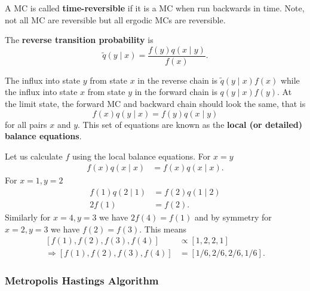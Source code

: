\begin{defe} \label{defe: trmc}
    A MC is called {\bf time-reversible} if it is a MC when run backwards in time. Note, not all MC are reversible but all ergodic MCs are reversible.
\end{defe}

\begin{defe} \label{defe: rtp}
    The {\bf reverse transition probability} is
    \[
        \tilde{q} (y \mid x) = \frac{f(y) q(x \mid y)}{f(x)}.
    \]
\end{defe}

The influx into state $y$ from state $x$ in the reverse chain is $\tilde{q} (y \mid x) f(x)$ while the influx into state $x$ from state $y$ in the forward chain is $q (y \mid x) f(y)$. At the limit state, the forward MC and backward chain should look the same, that is
\begin{equation*}
    f(x) q(y \mid x) = f(y) q (x \mid y)
\end{equation*}
for all pairs $x$ and $y$. This set of equations are known as the {\bf local (or detailed) balance equations}.

\begin{exam} \label{exam: lbe}
    Let us calculate $f$ using the local balance equations. For $x=y$
    \begin{align*}
        f (x) q(x \mid x) & = f (x) q(x \mid x).
    \end{align*}
    For $x= 1, y=2$
    \begin{align*}
        f(1) q (2 \mid 1) & = f(2) q(1 \mid 2) \\
        2 f(1)            & = f(2).
    \end{align*}
    Similarly for $x=4, y=3$ we have $2 f(4) = f(1)$ and by symmetry for $x=2, y=3$ we have $f(2) = f(3)$. This means
    \begin{align*}
        \left[ f(1), f(2), f(3), f(4) \right]             & \propto \left[ 1,2,2,1 \right]    \\
        \Rightarrow \left[ f(1), f(2), f(3), f(4) \right] & = \left[ 1/6,2/6,2/6,1/6 \right].
    \end{align*}
\end{exam}

\subsubsection*{Metropolis Hastings Algorithm}

